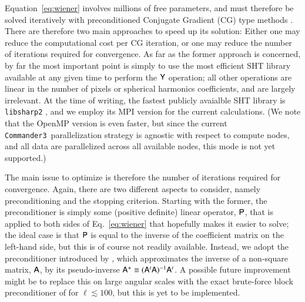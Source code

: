 \documentclass[twocolumn]{aa}
\def\commanderthree{\texttt{Commander3}}
\newcommand{\A}[0]{\tens{A}}
\newcommand{\Y}[0]{\tens{Y}}
\renewcommand{\P}[0]{\tens{P}}
\begin{document}
Equation~\eqref{eq:wiener} involves millions of free parameters, and
must therefore be solved iteratively with preconditioned Conjugate
Gradient (CG) type methods \citep{shewchuk:1994}. There are therefore
two main approaches to speed up its solution: Either one may reduce
the computational cost per CG iteration, or one may reduce the number
of iterations required for convergence. As far as the former approach
is concerned, by far the most important point is simply to use the
most efficient SHT library available at any given time to perform the
$\Y$ operation; all other operations are linear in the number of
pixels or spherical harmonics coefficients, and are largely
irrelevant. At the time of writing, the fastest publicly avaialble SHT
library is \texttt{libsharp2} \citep{reinecke2013}, and we employ its
MPI version for the current calculations. (We note that the OpenMP
version is even faster, but since the current
\commanderthree\ parallelization strategy is agnostic with respect to
compute nodes, and all data are parallelized across all available
nodes, this mode is not yet supported.)

The main issue to optimize is therefore the number of iterations
required for convergence. Again, there are two different aspects to
consider, namely preconditioning and the stopping criterion. Starting
with the former, the preconditioner is simply some (positive definite)
linear operator, $\P$, that is applied to both sides of
Eq.~\eqref{eq:wiener} that hopefully makes it easier to solve; the
ideal case is that $\P$ is equal to the inverse of the coefficient
matrix on the left-hand side, but this is of course not readily
available. Instead, we adopt the preconditioner introduced by
\citet{seljebotn:2019}, which approximates the inverse of a non-square
matrix, $\A$, by its pseudo-inverse $\A^{+}\equiv(\A^t\A)^{-1}\A^t$. A
possible future improvement might be to replace this on large angular
scales with the exact brute-force block preconditioner of
\citet{eriksen:2004,eriksen2008} for $\ell\lesssim 100$, but this is
yet to be implemented.
\end{document}
